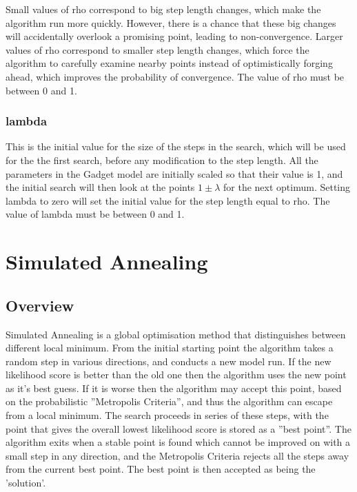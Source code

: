 \documentclass[10pt,twoside]{book}
\begin{document}
\bigskip
Small values of rho correspond to big step length changes, which make the algorithm run more quickly.  However, there is a chance that these big changes will accidentally overlook a promising point, leading to non-convergence.  Larger values of rho correspond to smaller step length changes, which force the algorithm to carefully examine nearby points instead of optimistically forging ahead, which improves the probability of convergence.  The value of rho must be between 0 and 1.

\subsubsection{lambda}
This is the initial value for the size of the steps in the search, which will be used for the the first search, before any modification to the step length.  All the parameters in the Gadget model are initially scaled so that their value is 1, and the initial search will then look at the points $1 \pm \lambda$ for the next optimum.  Setting lambda to zero will set the initial value for the step length equal to rho.  The value of lambda must be between 0 and 1.


\section{Simulated Annealing}\label{sec:simann}
\subsection{Overview}\label{subsec:simannover}
Simulated Annealing is a global optimisation method that distinguishes between different local minimum.  From the initial starting point the algorithm takes a random step in various directions, and conducts a new model run.  If the new likelihood score is better than the old one then the algorithm uses the new point as it's best guess.  If it is worse then the algorithm may accept this point, based on the probabilistic ''Metropolis Criteria'', and thus the algorithm can escape from a local minimum.  The search proceeds in series of these steps, with the point that gives the overall lowest likelihood score is stored as a ''best point''.  The algorithm exits when a stable point is found which cannot be improved on with a small step in any direction, and the Metropolis Criteria rejects all the steps away from the current best point.  The best point is then accepted as being the 'solution'.
\end{document}
